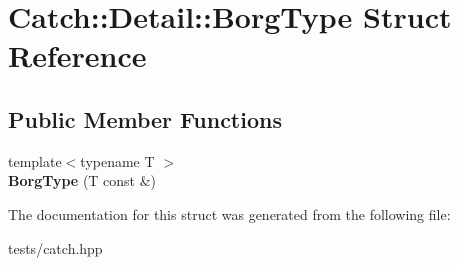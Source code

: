 \hypertarget{struct_catch_1_1_detail_1_1_borg_type}{}\section{Catch\+:\+:Detail\+:\+:Borg\+Type Struct Reference}
\label{struct_catch_1_1_detail_1_1_borg_type}
\subsection*{Public Member Functions}
\begin{DoxyCompactItemize}
\item 
\mbox{\label{struct_catch_1_1_detail_1_1_borg_type_a780a9946ed0d654f0bfc043c8fc505d8}} 
{\footnotesize template$<$typename T $>$ }\\{\bfseries Borg\+Type} (T const \&)
\end{DoxyCompactItemize}


The documentation for this struct was generated from the following file\+:\begin{DoxyCompactItemize}
\item 
tests/catch.\+hpp\end{DoxyCompactItemize}
